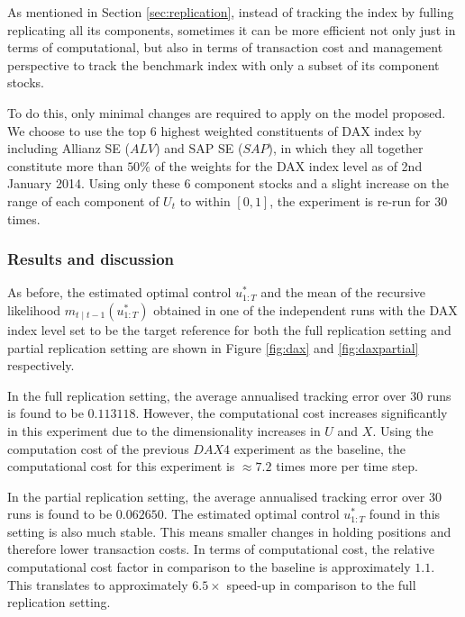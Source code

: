 As mentioned in Section \ref{sec:replication}, instead of tracking the index by fulling replicating all its components, sometimes it can be more efficient not only just in terms of computational, but also in terms of transaction cost and management perspective to track the benchmark index with only a subset of its component stocks.

To do this, only minimal changes are required to apply on the model proposed. We choose to use the top $6$ highest weighted constituents of DAX index by including Allianz SE ($ALV$) and SAP SE ($SAP$), in which they all together constitute more than $50\%$ of the weights for the DAX index level as of 2nd January 2014. Using only these $6$ component stocks and a slight increase on the range of each component of $U_t$ to within $[0,1]$, the experiment is re-run for $30$ times.

\subsubsection{Results and discussion}
As before, the estimated optimal control $u^*_{1:T}$ and the mean of the recursive likelihood $m_{t \mid t-1}(u^*_{1:T})$ obtained in one of the independent runs with the DAX index level set to be the target reference for both the full replication setting and partial replication setting are shown in Figure \ref{fig:dax} and \ref{fig:daxpartial} respectively.

In the full replication setting, the average annualised tracking error over $30$ runs is found to be $0.113118$. However, the computational cost increases significantly in this experiment due to the dimensionality increases in $U$ and $X$. Using the computation cost of the previous $DAX4$ experiment as the baseline, the computational cost for this experiment is $\approx 7.2$ times more per time step.

In the partial replication setting, the average annualised tracking error over $30$ runs is found to be $0.062650$. The estimated optimal control $u^*_{1:T}$ found in this setting is also much stable. This means smaller changes in holding positions and therefore lower transaction costs. In terms of computational cost, the relative computational cost factor in comparison to the baseline is approximately $1.1$. This translates to approximately $6.5\times$ speed-up in comparison to the full replication setting.

